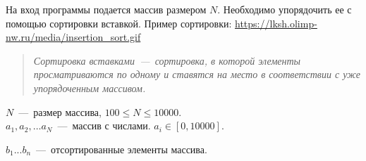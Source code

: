 На вход программы подается массив размером $N$. Необходимо упорядочить ее с помощью сортировки вставкой.
Пример сортировки: \url{https://lksh.olimp-nw.ru/media/insertion_sort.gif}

\begin{quote}
\textit{Сортировка вставками~---~сортировка, в которой элементы просматриваются по одному и ставятся на место в соответствии с уже упорядоченным массивом.}
\end{quote}

\InputFile

\noindent
$N$~---~размер массива, $100 \leq N \leq 10000$. \\
$a_1, a_2, \ldots a_N$~---~массив с числами. $ a_i \in [0, 10000]$. 

\OutputFile

\noindent
$b_1 ... b_n$~---~отсортированные элементы массива.

\SAMPLES
